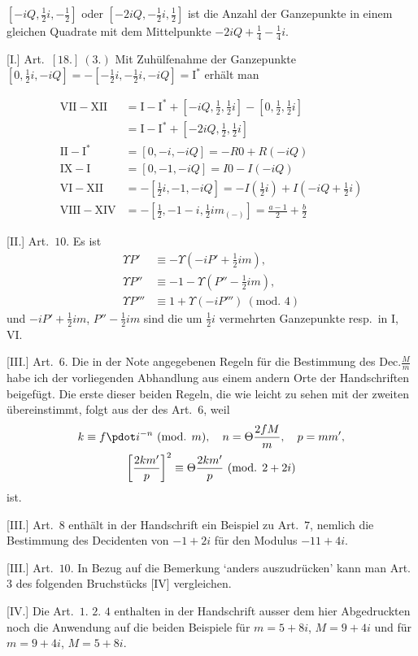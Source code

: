 $[-iQ,\tfrac12i,-\tfrac12]$ oder $[-2iQ,-\tfrac12i,\tfrac12]$ ist die Anzahl der Ganzepunkte in einem gleichen Quadrate mit dem Mittelpunkte $-2iQ+\tfrac14-\tfrac14i$.

[I.] Art.\ $[18.]\ (3.)$ Mit Zuhülfenahme der Ganzepunkte $[0,\tfrac12i,-iQ]=-[-\tfrac12i,-\tfrac12i,-iQ]=\mathrm{I}^{*}$ erhält man


\[
\begin{aligned}
\mathrm{VII}-\mathrm{XII}&=\mathrm{I}-\mathrm{I}^{*}+[-iQ,\tfrac12,\tfrac12i]-[0,\tfrac12,\tfrac12i]\\
&=\mathrm{I}-\mathrm{I}^{*}+[-2iQ,\tfrac12,\tfrac12i]\\
\mathrm{II}-\mathrm{I}^{*}&=[0,-i,-iQ]=-R0+R(-iQ)\\
\mathrm{IX}-\mathrm{I}&=[0,-1,-iQ]=I0-I(-iQ)\\
\mathrm{VI}-\mathrm{XII}&=-[\tfrac12i,-1,-iQ]=-I(\tfrac12i)+I(-iQ+\tfrac12i)\\
\mathrm{VIII}-\mathrm{XIV}&=-[\tfrac12,-1-i,\tfrac12im_{(-)}]=\frac{a-1}{2}+\frac b2
\end{aligned}
\]

[II.] Art.\ $10$. Es ist
\[
\begin{aligned}
\Upsilon P'&\equiv-\Upsilon(-iP'+\tfrac12im),\\
\Upsilon P''&\equiv-1-\Upsilon(P''-\tfrac12im),\\
\Upsilon P'''&\equiv1+\Upsilon(-iP''')\ (\text{mod. }4)
\end{aligned}
\]
und $-iP'+\tfrac12im$, $P''-\tfrac12im$ sind die um $\tfrac12i$ vermehrten Ganzepunkte resp.\ in I, VI.

[III.] Art.\ $6$. Die in der Note angegebenen Regeln für die Bestimmung des $\mathrm{Dec.}\frac Mm$ habe ich der vorliegenden Abhandlung aus einem andern Orte der Handschriften beigefügt. Die erste dieser beiden Regeln, die wie leicht zu sehen mit der zweiten übereinstimmt, folgt aus der des Art.\ $6$, weil
\[
\begin{gathered}
k\equiv f\pdot i^{-n}\ (\text{mod. }m),\quad n=\Theta\frac{2fM}{m},\quad p=mm',\\
\left[\frac{2km'}p\right]^2\equiv\Theta\frac{2km'}p\ (\text{mod. }2+2i)
\end{gathered}
\]
ist.

[III.] Art.\ $8$ enthält in der Handschrift ein Beispiel zu Art.\ $7$, nemlich die Bestimmung des Decidenten von $-1+2i$ für den Modulus $-11+4i$.

[III.] Art.\ $10$. In Bezug auf die Bemerkung ‘anders auszudrücken’ kann man Art.\ $3$ des folgenden Bruchstücks [IV] vergleichen.

[IV.] Die Art.\ $1$. $2$. $4$ enthalten in der Handschrift ausser dem hier Abgedruckten noch die Anwendung auf die beiden Beispiele für $m=5+8i$, $M=9+4i$ und für $m=9+4i$, $M=5+8i$.

